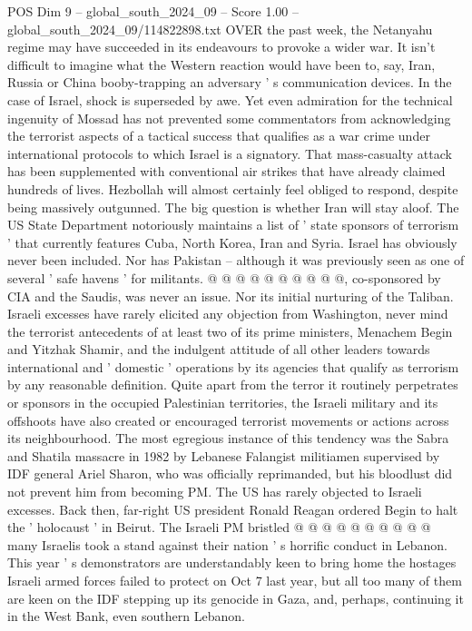 \begin{textsample}{POS Dim 9 – global\_south\_2024\_09 – Score 1.00 – global\_south\_2024\_09/114822898.txt}  \label{ex:f9_pos_253}
OVER the past week, the Netanyahu regime may have succeeded in its endeavours to provoke a wider war.
It isn't difficult to imagine what the Western reaction would have been to, say, Iran, Russia or China booby-trapping an adversary ' s communication devices.
In the case of Israel, shock is superseded by awe.
Yet even admiration for the technical ingenuity of Mossad has not prevented some commentators from acknowledging the terrorist aspects of a tactical success that qualifies as a war crime under international protocols to which Israel is a signatory.
That mass-casualty attack has been supplemented with conventional air strikes that have already claimed hundreds of lives.
Hezbollah will almost certainly feel obliged to respond, despite being massively outgunned.
The big question is whether Iran will stay aloof.
The US State Department notoriously maintains a list of ' state sponsors of terrorism ' that currently features Cuba, North Korea, Iran and Syria.
Israel has obviously never been included.
Nor has Pakistan -- although it was previously seen as one of several ' safe havens ' for militants. @ @ @ @ @ @ @ @ @ @, co-sponsored by CIA and the Saudis, was never an issue.
Nor its initial nurturing of the Taliban.
Israeli excesses have rarely elicited any objection from Washington, never mind the terrorist antecedents of at least two of its prime ministers, Menachem Begin and Yitzhak Shamir, and the indulgent attitude of all other leaders towards international and ' domestic ' operations by its agencies that qualify as terrorism by any reasonable definition.
Quite apart from the terror it routinely perpetrates or sponsors in the occupied Palestinian territories, the Israeli military and its offshoots have also created or encouraged terrorist movements or actions across its neighbourhood.
The most egregious instance of this tendency was the Sabra and Shatila massacre in 1982 by Lebanese Falangist militiamen supervised by IDF general Ariel Sharon, who was officially reprimanded, but his bloodlust did not prevent him from becoming PM.
The US has rarely objected to Israeli excesses.
Back then, far-right US president Ronald Reagan ordered Begin to halt the ' holocaust ' in Beirut.
The Israeli PM bristled @ @ @ @ @ @ @ @ @ @ many Israelis took a stand against their nation ' s horrific conduct in Lebanon.
This year ' s demonstrators are understandably keen to bring home the hostages Israeli armed forces failed to protect on Oct 7 last year, but all too many of them are keen on the IDF stepping up its genocide in Gaza, and, perhaps, continuing it in the West Bank, even southern Lebanon.

\end{textsample}
